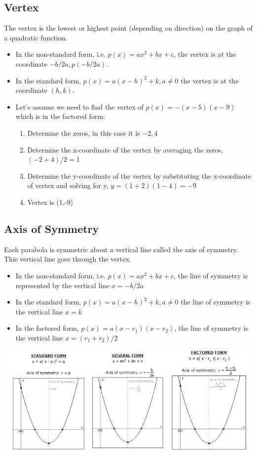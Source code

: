 \documentclass{book}
\begin{document}
	\subsection{Vertex}
	The vertex is the lowest or highest point (depending on direction) on the graph of a quadratic function.
	\begin{itemize}
		\item In the non-standard form, i.e. $p(x) = ax^2 + bx + c$, the vertex is at the coordinate $-b/2a, p(-b/2a)$.
		\item In the standard form, $p(x) = a(x-h)^2 + k, a \neq 0$ the vertex is at the coordinate $(h,k)$.
		\item Let's assume we need to find the vertex of $p(x) = -(x-5)(x-9)$ which is in the factored form:
		\begin{enumerate}
			\item Determine the zeros, in this case it is $-2,4$
			\item Determine the x-coordinate of the vertex by averaging the zeros, $(-2+4)/2 = 1$
			\item Determine the y-coordinate of the vertex by substituting the x-coordinate of vertex and solving for y, $y = (1+2)(1-4)=-9$
			\item Vertex is (1,-9)
		\end{enumerate}
		
		
	\end{itemize}
	
	
	\subsection{Axis of Symmetry}
	Each parabola is symmetric about a vertical line called the axis of symmetry.  This vertical line goes through the vertex.
	\begin{itemize}
		\item In the non-standard form, i.e. $p(x) = ax^2 + bx + c$, the line of symmetry is represented by the vertical line $x= -b/2a$
		\item In the standard form, $p(x) = a(x-h)^2 + k, a \neq 0$ the line of symmetry is the vertical line $x = k$ 
		\item In the factored form, $p(x) = a(x-r_1)(x-r_2)$, the line of symmetry is the vertical line $x = (r_1 + r_2)/2$ 
	\end{itemize}
	
	\includegraphics[scale=0.6]{parabolalos}
	
\end{document}
